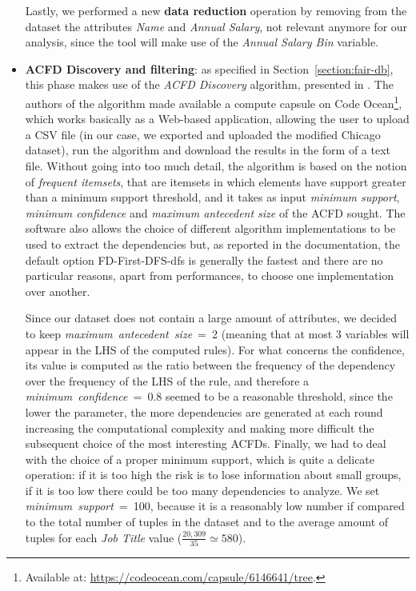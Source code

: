 \begin{itemize}
Lastly, we performed a new \textbf{data reduction} operation by removing from the dataset the attributes \textit{Name} and \textit{Annual Salary}, not relevant anymore for our analysis, since the tool will make use of the \textit{Annual Salary Bin} variable.
\item \textbf{ACFD Discovery and filtering}: as specified in Section~\ref{section:fair-db}, this phase makes use of the \textit{ACFD Discovery} algorithm, presented in \cite{rammelaere2018revisiting}. The authors of the algorithm made available a compute capsule on Code Ocean\footnote{Available at: \url{https://codeocean.com/capsule/6146641/tree}.}, which works basically as a Web-based application, allowing the user to upload a CSV file (in our case, we exported and uploaded the modified Chicago dataset), run the algorithm and download the results in the form of a text file. Without going into too much detail, the algorithm is based on the notion of \textit{frequent itemsets}, that are itemsets in which elements have support greater than a minimum support threshold, and it takes as input \textit{minimum support}, \textit{minimum confidence} and \textit{maximum antecedent size} of the ACFD sought. The software also allows the choice of different algorithm implementations to be used to extract the dependencies but, as reported in the documentation, the default option FD-First-DFS-dfs is generally the fastest and there are no particular reasons, apart from performances, to choose one implementation over another.

Since our dataset does not contain a large amount of attributes, we decided to keep \textit{maximum~antecedent~size}~=~2 (meaning that at most 3 variables will appear in the LHS of the computed rules).
For what concerns the confidence, its value is computed as the ratio between the frequency of the dependency over the frequency of the LHS of the rule, and therefore a \textit{minimum~confidence}~=~0.8 seemed to be a reasonable threshold, since the lower the parameter, the more dependencies are generated at each round increasing the computational complexity and making more difficult the subsequent choice of the most interesting ACFDs.
Finally, we had to deal with the choice of a proper minimum support, which is quite a delicate operation: if it is too high the risk is to lose information about small groups, if it is too low there could be too many dependencies to analyze. We set \textit{minimum~support}~=~100, because it is a reasonably low number if compared to the total number of tuples in the dataset and to the average amount of tuples for each \textit{Job Title} value (\(\frac{20,309}{35} \simeq 580\)).


\end{itemize}
